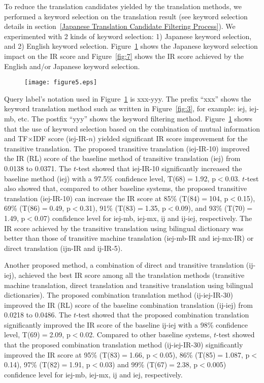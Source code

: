 \documentclass[english]{jnlp_1.3c}
\begin{document}
To reduce the translation candidates
yielded by the translation methods, we performed a keyword selection on
the translation result (see keyword selection details in
section~\ref{Japanese Translation Candidate Filtering Process}). We
experimented with 2 kinds of keyword selection: 1) Japanese keyword
selection, and 2) English keyword selection. Figure~\ref{fig:5} shows
the Japanese keyword selection impact on the IR score and
Figure~\ref{fig:7} shows the IR score achieved by the English and/or
Japanese keyword selection.  

\begin{figure}[b]
 \begin{center}
   \texttt{[image: figure5.eps]}
 \end{center}
 \label{fig:5}
\end{figure}

Query label's notation used in
Figure~\ref{fig:5} is xxx-yyy. The prefix ``xxx'' shows the keyword
translation method such as written in Figure~\ref{fig:3}, for example:
iej, iej-mb, etc. The postfix ``yyy'' shows the keyword filtering
method. Figure~\ref{fig:5} shows that the use of keyword selection based
on the combination of mutual information and TF×IDF score (iej-IR-$n$)
yielded significant IR score improvement for the transitive
translation. The proposed transitive translation (iej-IR-10) improved
the IR (RL) score of the baseline method of transitive translation (iej)
from 0.0138 to 0.0371. The $t$-test showed that iej-IR-10 significantly
increased the baseline method (iej) with a 97.5\% confidence level,
T(68)$=$1.92, p$<$0.03. $t$-test also showed that, compared to other
baseline systems, the proposed transitive translation (iej-IR-10) can
increase the IR score at 85\% (T(84)$=$104, p$<$0.15), 69\% (T(86)$=$0.49,
p$<$0.31), 91\% (T(83)$=$1.35, p$<$0.09), and 93\% (T(70)$=$1.49, p$<$0.07)
confidence level for iej-mb, iej-mx, ij and ij-iej, respectively. The IR
score achieved by the transitive translation using bilingual dictionary
was better than those of transitive machine translation (iej-mb-IR and
iej-mx-IR) or direct translation (ijn-IR and ij-IR-5).


Another proposed method, a combination of direct and transitive
translation (ij-iej), achieved the best IR score among all the
translation methods (transitive machine translation, direct translation
and transitive translation using bilingual dictionaries). The proposed
combination translation method (ij-iej-IR-30) improved the IR (RL) score
of the baseline combination translation (ij-iej) from 0.0218 to
0.0486. The $t$-test showed that the proposed combination translation
significantly improved the IR score of the baseline ij-iej with a 98\%
confidence level, T(69)$=$2.09, p$<$0.02. Compared to other baseline
systems, $t$-test showed that the proposed combination translation method
(ij-iej-IR-30) significantly improved the IR score at 95\% (T(83)$=$1.66, p$<$0.05), 
86\% (T(85)$=$1.087, p$<$0.14), 97\% (T(82)$=$1.91, p$<$0.03)
and 99\% (T(67)$=$2.38, p$<$0.005) confidence level for iej-mb, iej-mx, ij
and iej, respectively.  
\end{document}
